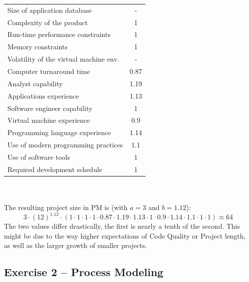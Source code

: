 \documentclass{scrartcl}
\begin{document}
\begin{itemize}
\begin{tabular}{l | c}
		Size of application database & -\\

		Complexity of the product & 1\\

		Run-time performance constraints  & 1\\

		Memory constraints & 1\\

		Volatility of the virtual machine env. & -\\

		Computer turnaround time & 0.87\\

		Analyst capability & 1.19\\

		Applications experience & 1.13\\

		Software engineer capability & 1\\

		Virtual machine experience & 0.9\\

		Programming language experience & 1.14\\

		Use of modern programming practices & 1.1\\

		Use of software tools & 1\\

		Required development schedule & 1\\
	\end{tabular}\\\\
	The resulting project size in PM is (with $a=3$ and $b=1.12$):
	\[3 \cdot (12)^{1.12}\cdot (1\cdot 1 \cdot 1 \cdot 1 \cdot 0.87 \cdot 1.19 \cdot 1.13 \cdot 1 \cdot 0.9 \cdot 1.14 \cdot 1.1 \cdot 1 \cdot 1) \approx 64\]
	The two values differ drastically, the first is nearly a tenth of the second.
        This might be due to the way higher expectations of Code Quality or Project length, as well as the larger growth of smaller projects.
\end{itemize}

\subsection*{Exercise 2 – Process Modeling}
\end{document}
